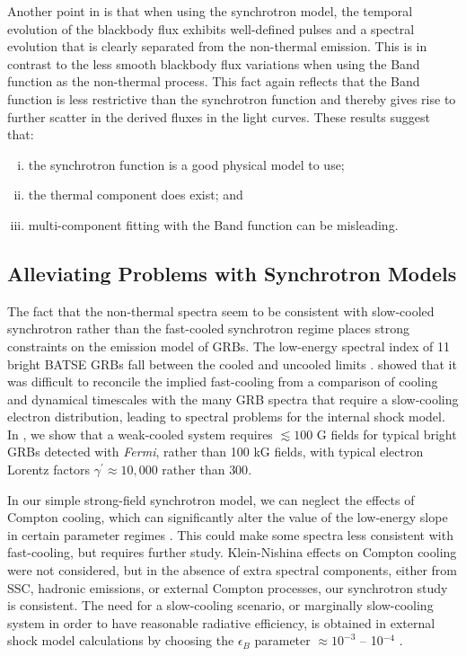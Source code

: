 Another point in  is that when using the
synchrotron model, the temporal evolution of the blackbody flux
exhibits well-defined pulses and a spectral evolution that is clearly
separated from the non-thermal emission. This is in contrast to the
less smooth blackbody flux variations when using the Band function as
the non-thermal process. This fact again reflects that the Band
function is less restrictive than the synchrotron function and thereby
gives rise to further scatter in the derived fluxes in the light
curves. These results suggest that:
\begin{enumerate}[(i)]
 \item the synchrotron function is a good physical model to use;
 \item the thermal component does exist; and
 \item multi-component fitting with the Band function can be misleading.
\end{enumerate}



\subsection{Alleviating Problems with Synchrotron Models}
\label{sec:ascp}
The fact that the non-thermal spectra seem to be consistent with
slow-cooled synchrotron rather than the fast-cooled synchrotron regime
places strong constraints on the emission model of GRBs.  The
low-energy spectral index of 11 bright BATSE GRBs fall between the
cooled and uncooled limits \cite{Cohen:1997}.  \cite{Ghisellini:2000}
showed that it was difficult to reconcile the implied fast-cooling
from a comparison of cooling and dynamical timescales with the many
GRB spectra that require a slow-cooling electron distribution, leading
to spectral problems for the internal shock model. In , we
show that a weak-cooled system requires $\lesssim 100$ G fields for
typical bright GRBs detected with {\it Fermi}, rather than 100 kG
fields, with typical electron Lorentz factors $\gamma^\prime \approx
10,000$ rather than $300$.


In our simple strong-field synchrotron model, we can neglect the
effects of Compton cooling, which can significantly alter the value of
the low-energy slope in certain parameter regimes
\cite{Daigne:2011}. This could make some spectra less consistent with
fast-cooling, but requires further study.  Klein-Nishina effects on
Compton cooling were not considered, but in the absence of extra
spectral components, either from SSC, hadronic emissions, or external
Compton processes, our synchrotron study is consistent. The need for a
slow-cooling scenario, or marginally slow-cooling system in order to
have reasonable radiative efficiency, is obtained in external shock
model calculations by choosing the $\epsilon_B$ parameter $\approx
10^{-3}$ -- 10$^{-4}$ \cite{Chiang:1999}.

